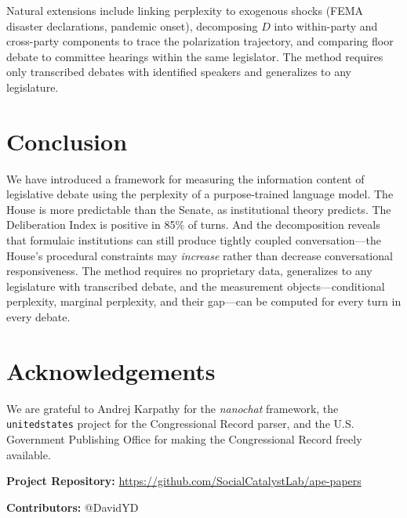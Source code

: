 \documentclass[12pt]{article}
\newcommand{\DI}{\mathit{D}}
\begin{document}
Natural extensions include linking perplexity to exogenous shocks (FEMA disaster declarations, pandemic onset), decomposing $\DI$ into within-party and cross-party components to trace the polarization trajectory, and comparing floor debate to committee hearings within the same legislator. The method requires only transcribed debates with identified speakers and generalizes to any legislature.


\section{Conclusion}

We have introduced a framework for measuring the information content of legislative debate using the perplexity of a purpose-trained language model. The House is more predictable than the Senate, as institutional theory predicts. The Deliberation Index is positive in 85\% of turns. And the decomposition reveals that formulaic institutions can still produce tightly coupled conversation---the House's procedural constraints may \textit{increase} rather than decrease conversational responsiveness. The method requires no proprietary data, generalizes to any legislature with transcribed debate, and the measurement objects---conditional perplexity, marginal perplexity, and their gap---can be computed for every turn in every debate.


\section*{Acknowledgements}

We are grateful to Andrej Karpathy for the \textit{nanochat} framework, the \texttt{unitedstates} project for the Congressional Record parser, and the U.S. Government Publishing Office for making the Congressional Record freely available.

\noindent\textbf{Project Repository:} \url{https://github.com/SocialCatalystLab/ape-papers}

\noindent\textbf{Contributors:} @DavidYD

\label{apep_main_text_end}
\newpage


\newpage
\appendix

\end{document}
